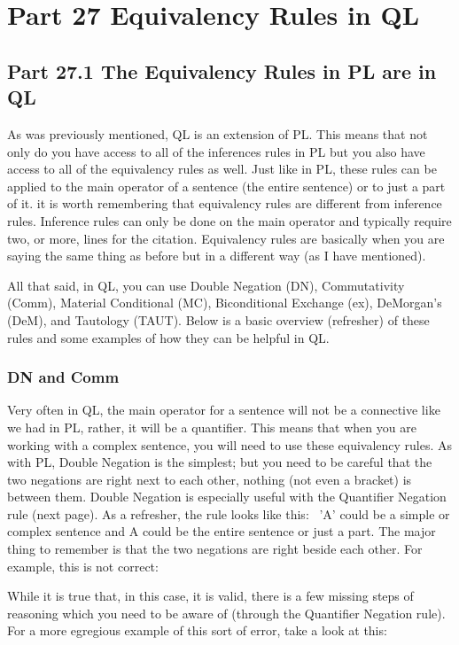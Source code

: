 \chapter{Part 27 Equivalency Rules in QL}
\section{Part 27.1 The Equivalency Rules in PL are in QL}
As was previously mentioned, QL is an extension of PL. This means that not only do you have access to all of the inferences rules in PL but you also have access to all of the equivalency rules as well. Just like in PL, these rules can be applied to the main operator of a sentence (the entire sentence) or to just a part of it. it is worth remembering that equivalency rules are different from inference rules. Inference rules can only be done on the main operator and typically require two, or more, lines for the citation. Equivalency rules are basically when you are saying the same thing as before but in a different way (as I have mentioned). 

All that said, in QL, you can use Double Negation (DN), Commutativity (Comm), Material Conditional (MC), Biconditional Exchange (\eiff ex), DeMorgan's (DeM), and Tautology (TAUT). Below is a basic overview (refresher) of these rules and some examples of how they can be helpful in QL.

\subsection{DN and Comm}

Very often in QL, the main operator for a sentence will not be a connective like we had in PL, rather, it will be a quantifier. This means that when you are working with a complex sentence, you will need to use these equivalency rules. As with PL, Double Negation is the simplest; but you need to be careful that the two negations are right next to each other, nothing (not even a bracket) is between them. Double Negation is especially useful with the Quantifier Negation rule (next page). As a refresher, the rule looks like this: 
'A' could be a simple or complex sentence and A could be the entire sentence or just a part. The major thing to remember is that the two negations are right beside each other. For example, this is not correct:
\begin{fitchproof}
\end{fitchproof}
While it is true that, in this case, it is valid, there is a few missing steps of reasoning which you need to be aware of (through the Quantifier Negation rule). For a more egregious example of this sort of error, take a look at this: 
\begin{fitchproof}
\end{fitchproof}

